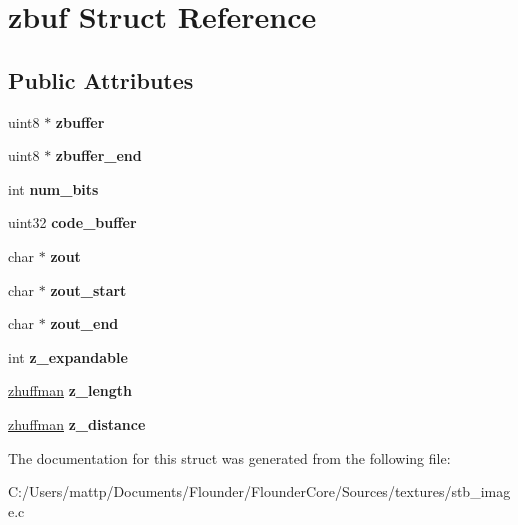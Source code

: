 \hypertarget{structzbuf}{}\section{zbuf Struct Reference}
\label{structzbuf}
\subsection*{Public Attributes}
\begin{DoxyCompactItemize}
\item 
\mbox{\label{structzbuf_a7080eb91dcc67e1dfe818d08e6f22c4e}} 
uint8 $\ast$ {\bfseries zbuffer}
\item 
\mbox{\label{structzbuf_af030baa17bebedd18272678da17a33f4}} 
uint8 $\ast$ {\bfseries zbuffer\+\_\+end}
\item 
\mbox{\label{structzbuf_acd069cdb4100884a732ad2794edbbdff}} 
int {\bfseries num\+\_\+bits}
\item 
\mbox{\label{structzbuf_a3bb8244d7be17801079c5a8587182edb}} 
uint32 {\bfseries code\+\_\+buffer}
\item 
\mbox{\label{structzbuf_aaf137c25fa5b9fb14e92354da4203c38}} 
char $\ast$ {\bfseries zout}
\item 
\mbox{\label{structzbuf_af31571e8d74c78c9bb18d92205150b28}} 
char $\ast$ {\bfseries zout\+\_\+start}
\item 
\mbox{\label{structzbuf_af07c0b7b7227f670ee1413bc0dcab791}} 
char $\ast$ {\bfseries zout\+\_\+end}
\item 
\mbox{\label{structzbuf_ae662f24e0973ca19b543e64647a6bfb6}} 
int {\bfseries z\+\_\+expandable}
\item 
\mbox{\label{structzbuf_a5906bdbe9dfb565339acac51af9efe89}} 
\hyperlink{structzhuffman}{zhuffman} {\bfseries z\+\_\+length}
\item 
\mbox{\label{structzbuf_ae7d9588b2548708e14f3c6ad89bf26b5}} 
\hyperlink{structzhuffman}{zhuffman} {\bfseries z\+\_\+distance}
\end{DoxyCompactItemize}


The documentation for this struct was generated from the following file\+:\begin{DoxyCompactItemize}
\item 
C\+:/\+Users/mattp/\+Documents/\+Flounder/\+Flounder\+Core/\+Sources/textures/stb\+\_\+image.\+c\end{DoxyCompactItemize}
